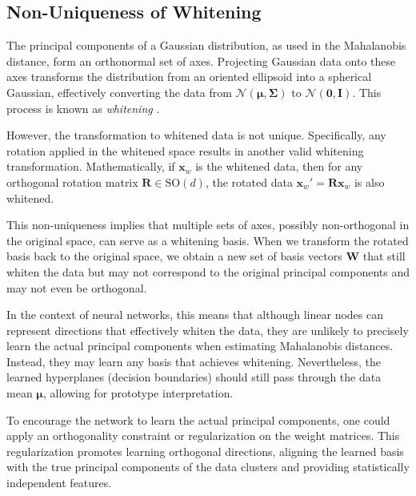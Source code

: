 \subsection{Non-Uniqueness of Whitening}

The principal components of a Gaussian distribution, as used in the Mahalanobis distance, form an orthonormal set of axes. Projecting Gaussian data onto these axes transforms the distribution from an oriented ellipsoid into a spherical Gaussian, effectively converting the data from \(\mathcal{N}(\boldsymbol{\mu}, \boldsymbol{\Sigma})\) to \(\mathcal{N}(\mathbf{0}, \mathbf{I})\). This process is known as \emph{whitening} \citep[Section 12.1.3]{bishop2006pattern}.

However, the transformation to whitened data is not unique. Specifically, any rotation applied in the whitened space results in another valid whitening transformation. Mathematically, if \(\mathbf{x}_w\) is the whitened data, then for any orthogonal rotation matrix \(\mathbf{R} \in \text{SO}(d)\), the rotated data \(\mathbf{x}_w' = \mathbf{R} \mathbf{x}_w\) is also whitened.

This non-uniqueness implies that multiple sets of axes, possibly non-orthogonal in the original space, can serve as a whitening basis. When we transform the rotated basis back to the original space, we obtain a new set of basis vectors \(\mathbf{W}\) that still whiten the data but may not correspond to the original principal components and may not even be orthogonal.

In the context of neural networks, this means that although linear nodes can represent directions that effectively whiten the data, they are unlikely to precisely learn the actual principal components when estimating Mahalanobis distances. Instead, they may learn any basis that achieves whitening. Nevertheless, the learned hyperplanes (decision boundaries) should still pass through the data mean \(\boldsymbol{\mu}\), allowing for prototype interpretation.

To encourage the network to learn the actual principal components, one could apply an orthogonality constraint or regularization on the weight matrices. This regularization promotes learning orthogonal directions, aligning the learned basis with the true principal components of the data clusters and providing statistically independent features.
